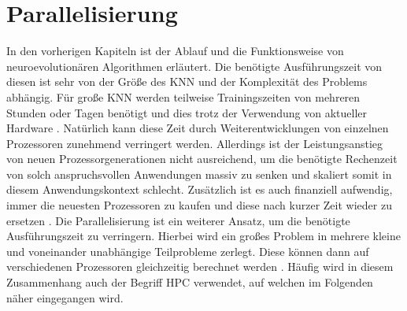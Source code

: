 \section{Parallelisierung}
In den vorherigen Kapiteln ist der Ablauf und die Funktionsweise von neuroevolutionären Algorithmen erläutert. Die benötigte Ausführungszeit von diesen ist sehr von der Größe des \ac{KNN} und der Komplexität des Problems abhängig. Für große \ac{KNN} werden teilweise Trainingszeiten von mehreren Stunden oder Tagen benötigt und dies trotz der Verwendung von aktueller Hardware \cite{such2017deep}. Natürlich kann diese Zeit durch Weiterentwicklungen von einzelnen Prozessoren zunehmend verringert werden. Allerdings ist der Leistungsanstieg von neuen Prozessorgenerationen nicht ausreichend, um die benötigte Rechenzeit von solch anspruchsvollen Anwendungen massiv zu senken und skaliert somit in diesem Anwendungskontext schlecht. Zusätzlich ist es auch finanziell aufwendig, immer die neuesten Prozessoren zu kaufen und diese nach kurzer Zeit wieder zu ersetzen \cite{swann2002maximum}. Die Parallelisierung ist ein weiterer Ansatz, um die benötigte Ausführungszeit zu verringern. Hierbei wird ein großes Problem in mehrere kleine und voneinander unabhängige Teilprobleme zerlegt. Diese können dann auf verschiedenen Prozessoren gleichzeitig berechnet werden \cite{swann2002maximum}. Häufig wird in diesem Zusammenhang auch der Begriff \ac{HPC} verwendet, auf welchen im Folgenden näher eingegangen wird.

